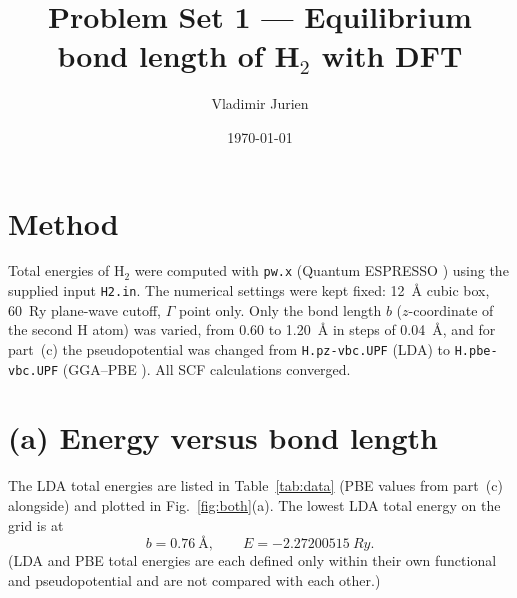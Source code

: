 \documentclass[11pt,a4paper]{article}
\title{\vspace{-1.3cm}Problem Set 1 --- Equilibrium bond length of H$_2$ with DFT}
\author{Vladimir Jurien}
\date{\today}
\begin{document}
\maketitle
\vspace{-1.1cm}

\section*{Method}
Total energies of H$_2$ were computed with \texttt{pw.x} (Quantum ESPRESSO \cite{QE}) using the
supplied input \texttt{H2.in}. The numerical settings were kept fixed: \SI{12}{\angstrom} cubic
box, \SI{60}{Ry} plane-wave cutoff, $\Gamma$ point only. Only the bond length $b$ ($z$-coordinate
of the second H atom) was varied, from 0.60 to \SI{1.20}{\angstrom} in steps of \SI{0.04}{\angstrom},
and for part~(c) the pseudopotential was changed from \texttt{H.pz-vbc.UPF} (LDA) to
\texttt{H.pbe-vbc.UPF} (GGA--PBE \cite{PBE}). All SCF calculations converged.

\section*{(a) Energy versus bond length}
The LDA total energies are listed in Table~\ref{tab:data} (PBE values from part~(c) alongside)
and plotted in Fig.~\ref{fig:both}(a). The lowest LDA total energy on the grid is at
\[
  b = \SI{0.76}{\angstrom}, \qquad E = \SI{-2.27200515}{Ry}.
\]
(LDA and PBE total energies are each defined only within their own functional and pseudopotential
and are not compared with each other.)
\end{document}
